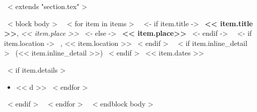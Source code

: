 ~< extends "section.tex" >~

~< block body >~
~< for item in items >~
    ~<- if item.title ->~
    \textbf{<< item.title >>}, \emph{<< item.place >>}
    ~<- else ->~
    \textbf{<< item.place>>}
    ~<- endif ->~
    ~<- if item.location ->~
    , << item.location >>
    ~< endif >~
    ~< if item.inline_detail >~
    {\footnotesize \color{gray} (<< item.inline_detail >>)}
    ~< endif >~
    \hfill << item.dates >> \par
    ~< if item.details >~
        \begin{itemize} %
            ~< for d in item.details >~
                \item {\footnotesize \color{gray} << d >>}
            ~< endfor >~
        \end{itemize} \par
    ~< endif >~ 
~< endfor >~
~< endblock body >~